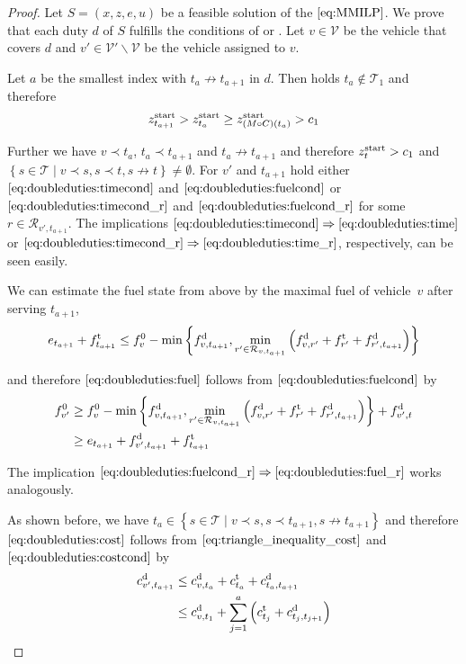 \begin{proof}

Let $S=\left(x,z,e,u\right)$ be a feasible solution of the $\eqref{eq:MMILP}$. We prove that each duty $d$ of $S$ fulfills the conditions of  or . Let ${v\in\mathcal{V}}$ be the vehicle that covers $d$ and ${v'\in\mathcal{V}'\backslash\mathcal{V}}$ be the vehicle assigned to $v$.

Let $a$ be the smallest index with ${t_a\not\to t_{a+1}}$ in $d$. Then holds ${t_a\not\in\mathcal{T}_1}$ and therefore
\begin{align*}
	 z^{\operatorname{start}}_{t_{a+1}} > z^{\operatorname{start}}_{t_a} \geq z^{\operatorname{start}}_{\left(M\circ C\right)\left(t_a\right)} > c_1
\end{align*}

Further we have $v\prec t_a$, $t_a\prec t_{a+1}$ and $t_a\not\to t_{a+1}$ and therefore ${z^{\operatorname{start}}_t>c_1}$ and ${\left\{s\in\mathcal{T}\mid v\prec s, s\prec t, s\not\to t\right\}\neq\emptyset}$. For $v'$ and $t_{a+1}$ hold either $\eqref{eq:doubleduties:timecond}$ and $\eqref{eq:doubleduties:fuelcond}$ or $\eqref{eq:doubleduties:timecond_r}$ and $\eqref{eq:doubleduties:fuelcond_r}$ for some ${r\in\mathcal{R}_{v',t_{a+1}}}$. The implications ${\eqref{eq:doubleduties:timecond}\Rightarrow\eqref{eq:doubleduties:time}}$ or ${\eqref{eq:doubleduties:timecond_r}\Rightarrow\eqref{eq:doubleduties:time_r}}$, respectively, can be seen easily.

We can estimate the fuel state from above by the maximal fuel of vehicle~$v$ after serving $t_{a+1}$, \ie
\begin{align*}
	e_{t_{a+1}} + f^{\operatorname{t}}_{t_{a+1}} \leq f^0_v - \min\left\{f^{\operatorname{d}}_{v,t_{a+1}}, \min_{r'\in\mathcal{R}_{v,t_{a+1}}}\left(f^{\operatorname{d}}_{v,r'}+f^{\operatorname{t}}_{r'}+f^{\operatorname{d}}_{r',t_{a+1}}\right)\right\}
\end{align*}

and therefore $\eqref{eq:doubleduties:fuel}$ follows from $\eqref{eq:doubleduties:fuelcond}$ by
\begin{align*}
	f^0_{v'} & \geq f^0_v - \min\left\{f^{\operatorname{d}}_{v,t_{a+1}}, \min_{r'\in\mathcal{R}_{v,t_{a+1}}}\left(f^{\operatorname{d}}_{v,r'}+f^{\operatorname{t}}_{r'}+f^{\operatorname{d}}_{r',t_{a+1}}\right)\right\} + f^{\operatorname{d}}_{v',t} \\
	& \geq e_{t_{a+1}} + f^{\operatorname{d}}_{v',t_{a+1}} + f^{\operatorname{t}}_{t_{a+1}}
\end{align*}

The implication ${\eqref{eq:doubleduties:fuelcond_r}\Rightarrow\eqref{eq:doubleduties:fuel_r}}$ works analogously.

As shown before, we have ${t_a\in\left\{s\in\mathcal{T}\mid v\prec s, s\prec t_{a+1}, s\not\to t_{a+1}\right\}}$ and therefore $\eqref{eq:doubleduties:cost}$ follows from $\eqref{eq:triangle_inequality_cost}$ and $\eqref{eq:doubleduties:costcond}$ by
\begin{align*}
	c^{\operatorname{d}}_{v',t_{a+1}} & \leq c^{\operatorname{d}}_{v,t_a} + c^{\operatorname{t}}_{t_a} + c^{\operatorname{d}}_{t_a,t_{a+1}} \\
	& \leq c^{\operatorname{d}}_{v,t_1} + \sum_{j=1}^a \left(c^{\operatorname{t}}_{t_j} + c^{\operatorname{d}}_{t_j,t_{j+1}}\right)
\end{align*}


\end{proof}
